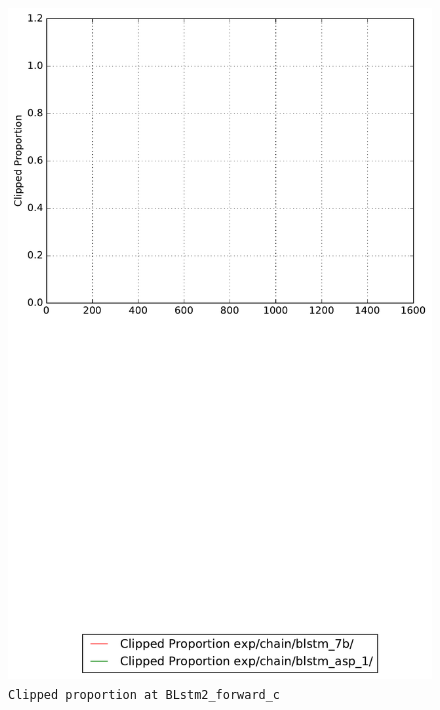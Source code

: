 \documentclass[prl,10pt,twocolumn]{revtex4}
\begin{document}
\newpage
\begin{figure}[h]
  \begin{center}
    \caption{\texttt{Clipped proportion at BLstm2\_forward\_c}}
    \includegraphics[width=\textwidth]{exp/chain/blstm_7b/report/clipped_proportion_BLstm2_forward_c.pdf}
  \end{center}
\end{figure}
\clearpage
\end{document}
